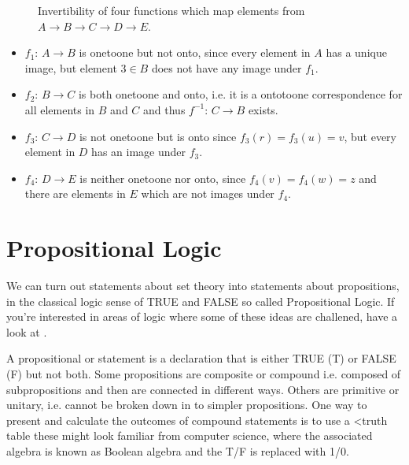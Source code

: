 \documentclass[letterpaper,10pt,english]{jupyterBook}
\begin{document}
\begin{figure}[htbp]
\centering
\capstart

\noindent{}
\caption{Invertibility of four functions which map elements from \(A \rightarrow B \rightarrow C \rightarrow D \rightarrow E\).}\label{\detokenize{ProofLogic/functions:invertibilityoffunctions}}\end{figure}
\begin{itemize}
\item {} 
\sphinxAtStartPar
\(f_1:\,A \rightarrow B\) is one\sphinxhyphen{}to\sphinxhyphen{}one but not onto, since every element in \(A\) has a unique image, but element \(3 \in B\) does not have any image under \(f_1\).

\item {} 
\sphinxAtStartPar
\(f_2:\,B \rightarrow C\) is both one\sphinxhyphen{}to\sphinxhyphen{}one and onto, i.e. it is a onto\sphinxhyphen{}to\sphinxhyphen{}one correspondence for all elements in \(B\) and \(C\) and thus \(f^{-1}:\, C \rightarrow B\) exists.

\item {} 
\sphinxAtStartPar
\(f_3:\,C \rightarrow D\) is not one\sphinxhyphen{}to\sphinxhyphen{}one but is onto since \(f_3(r) = f_3(u) = v\), but every element in \(D\) has an image under \(f_3\).

\item {} 
\sphinxAtStartPar
\(f_4:\, D \rightarrow E\) is neither one\sphinxhyphen{}to\sphinxhyphen{}one nor onto, since \(f_4(v) = f_4(w) = z\) and there are elements in \(E\) which are not images under \(f_4\).

\end{itemize}


\chapter{Propositional Logic}
\label{\detokenize{ProofLogic/propositionallogic:propositional-logic}}\label{\detokenize{ProofLogic/propositionallogic::doc}}
\sphinxAtStartPar
We can turn out statements about set theory into statements about propositions, in the classical logic sense of TRUE and FALSE \sphinxhyphen{} so called
Propositional Logic.  If you’re interested in areas of logic where some of these ideas are challened, have a look at
.

\sphinxAtStartPar
A propositional or statement is a declaration that is either TRUE (T) or FALSE (F) but not both.  Some propositions are composite or
compound \sphinxhyphen{} i.e. composed of sub\sphinxhyphen{}propositions and then are connected in different ways.  Others are primitive or unitary, i.e. cannot be broken down in to
simpler propositions.  One way to present and calculate the outcomes of compound statements is to use a <truth table \sphinxhyphen{} these might look familiar from computer science,
where the associated algebra is known as Boolean algebra and the T/F is replaced with 1/0.
\end{document}
